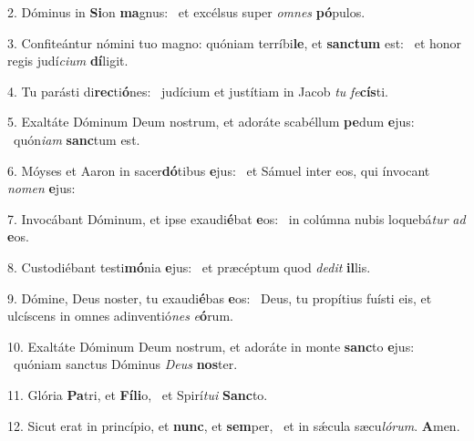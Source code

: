 2. Dóminus in \textbf{Si}on \textbf{ma}gnus: \ast\  et excélsus super \textit{om}\textit{nes} \textbf{pó}pulos.\

3. Confiteántur nómini tuo magno: quóniam terríbi\textbf{le}, et \textbf{sanc}\textbf{tum} est: \ast\  et honor regis judí\textit{ci}\textit{um} \textbf{dí}ligit.\

4. Tu parásti di\textbf{rec}ti\textbf{ó}nes: \ast\  judícium et justítiam in Jacob \textit{tu} \textit{fe}\textbf{cís}ti.\

5. Exaltáte Dóminum Deum nostrum, et adoráte scabéllum \textbf{pe}dum \textbf{e}jus: \ast\  quón\textit{i}\textit{am} \textbf{sanc}tum est.\

6. Móyses et Aaron in sacer\textbf{dó}tibus \textbf{e}jus: \ast\  et Sámuel inter eos, qui ínvocant \textit{no}\textit{men} \textbf{e}jus:\

7. Invocábant Dóminum, et ipse exaudi\textbf{é}bat \textbf{e}os: \ast\  in colúmna nubis loquebá\textit{tur} \textit{ad} \textbf{e}os.\

8. Custodiébant testi\textbf{mó}nia \textbf{e}jus: \ast\  et præcéptum quod \textit{de}\textit{dit} \textbf{il}lis.\

9. Dómine, Deus noster, tu exaudi\textbf{é}bas \textbf{e}os: \ast\  Deus, tu propítius fuísti eis, et ulcíscens in omnes adinventió\textit{nes} \textit{e}\textbf{ó}rum.\

10. Exaltáte Dóminum Deum nostrum, et adoráte in monte \textbf{sanc}to \textbf{e}jus: \ast\  quóniam sanctus Dóminus \textit{De}\textit{us} \textbf{nos}ter.\

11. Glória \textbf{Pa}tri, et \textbf{Fí}\textbf{li}o, \ast\  et Spirí\textit{tu}\textit{i} \textbf{Sanc}to.\

12. Sicut erat in princípio, et \textbf{nunc}, et \textbf{sem}per, \ast\  et in sǽcula sæcu\textit{ló}\textit{rum}. \textbf{A}men.\

